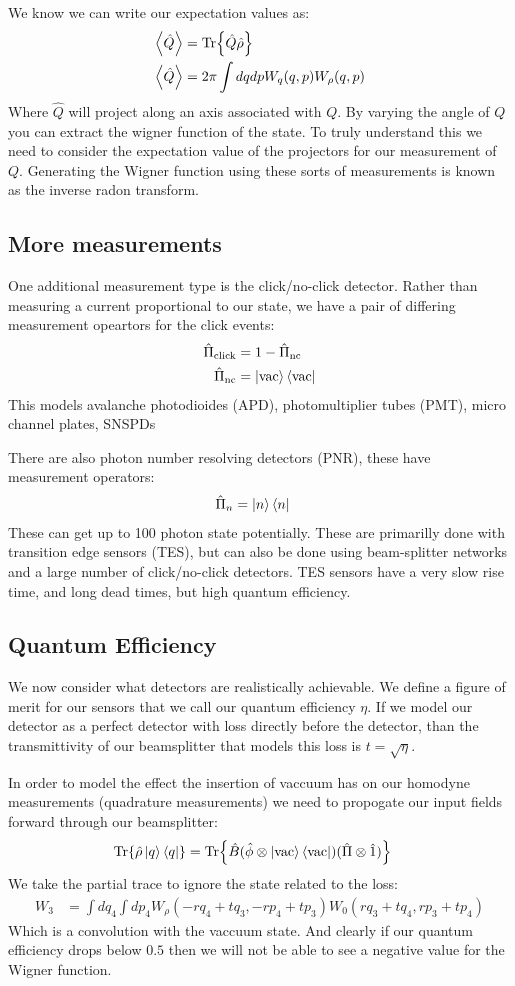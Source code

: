 We know we can write our expectation values as:
\begin{align*}
	\expval{\hat{Q}} &= \Tr{\hat{Q}\hat{\rho}} \\
	\expval{\hat{Q}} &= 2\pi \int dqdp W_q(q,p)W_\rho(q,p)
\end{align*}
Where $\hat{Q}$ will project along an axis associated with $Q$. By varying the angle of $Q$ you can extract the wigner function of the state. To truly understand this we need to consider the expectation value of the projectors for our measurement of $Q$.
Generating the Wigner function using these sorts of measurements is known as the inverse radon transform.
\subsection{More measurements}
One additional measurement type is the click/no-click detector. Rather than measuring a current proportional to our state, we have a pair of differing measurement opeartors for the click events:
\begin{align*}
	\hat{\Pi}_\text{click} &= 1 - \hat{\Pi}_\text{nc} \\
	\hat{\Pi}_\text{nc} &= \ket{\text{vac}}\bra{\text{vac}}
\end{align*}
This models avalanche photodioides (APD), photomultiplier tubes (PMT), micro channel plates, SNSPDs

There are also photon number resolving detectors (PNR), these have measurement operators:
\begin{align*}
	\hat{\Pi}_n &= \ket{n}\bra{n}
\end{align*}
These can get up to 100 photon state potentially. These are primarilly done with transition edge sensors (TES), but can also be done using beam-splitter networks and a large number of click/no-click detectors.
TES sensors have a very slow rise time, and long dead times, but high quantum efficiency.

\subsection{Quantum Efficiency}
We now consider what detectors are realistically achievable. We define a figure of merit for our sensors that we call our quantum efficiency $\eta$.
If we model our detector as a perfect detector with loss directly before the detector, than the transmittivity of our beamsplitter that models this loss is $t=\sqrt{\eta}$.

In order to model the effect the insertion of vaccuum has on our homodyne measurements (quadrature measurements) we need to propogate our input fields forward through our beamsplitter:
\begin{align*}
	\Tr{\hat{\rho}\ket{q}\bra{q}} &= \Tr{\hat{B}(\hat{\phi}\otimes\ket{\text{vac}}\bra{\text{vac}})(\hat{\Pi}\otimes\hat{1})}
\end{align*}
We take the partial trace to ignore the state related to the loss:
\begin{align*}
	W_3 &= \int dq_4\int dp_4 W_\rho(-r q_4 + t q_3, -rp_4 + tp_3) W_0(rq_3 + tq_4, rp_3 + tp_4)
\end{align*}
Which is a convolution with the vaccuum state. And clearly if our quantum efficiency drops below $0.5$ then we will not be able to see a negative value for the Wigner function.
